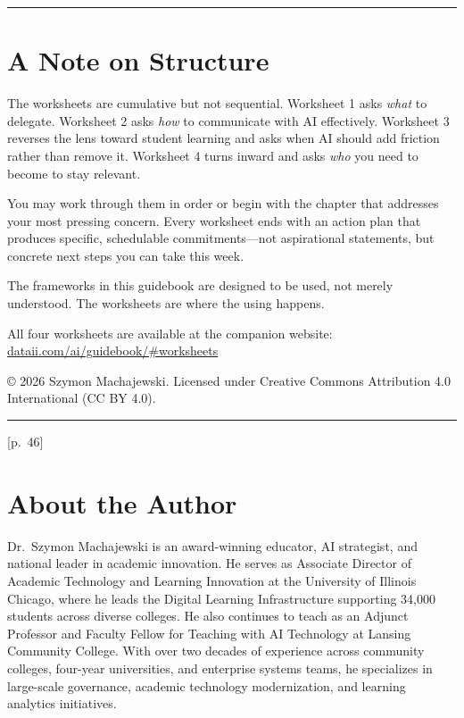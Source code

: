\documentclass[
  letterpaper,
  DIV=11,
  numbers=noendperiod]{scrreprt}
\begin{document}
\begin{center}\rule{0.5\linewidth}{0.5pt}\end{center}


\chapter{A Note on Structure}\label{a-note-on-structure}

The worksheets are cumulative but not sequential. Worksheet 1 asks
\emph{what} to delegate. Worksheet 2 asks \emph{how} to communicate with
AI effectively. Worksheet 3 reverses the lens toward student learning
and asks when AI should add friction rather than remove it. Worksheet 4
turns inward and asks \emph{who} you need to become to stay relevant.

You may work through them in order or begin with the chapter that
addresses your most pressing concern. Every worksheet ends with an
action plan that produces specific, schedulable commitments---not
aspirational statements, but concrete next steps you can take this week.

The frameworks in this guidebook are designed to be used, not merely
understood. The worksheets are where the using happens.

All four worksheets are available at the companion website:
\href{https://dataii.com/ai/guidebook/\#worksheets}{dataii.com/ai/guidebook/\#worksheets}

© 2026 Szymon Machajewski. Licensed under Creative Commons Attribution
4.0 International (CC BY 4.0).

\begin{center}\rule{0.5\linewidth}{0.5pt}\end{center}

{[}p.~46{]}


\chapter{About the Author}\label{about-the-author}

Dr.~Szymon Machajewski is an award-winning educator, AI strategist, and
national leader in academic innovation. He serves as Associate Director
of Academic Technology and Learning Innovation at the University of
Illinois Chicago, where he leads the Digital Learning Infrastructure
supporting 34,000 students across diverse colleges. He also continues to
teach as an Adjunct Professor and Faculty Fellow for Teaching with AI
Technology at Lansing Community College. With over two decades of
experience across community colleges, four-year universities, and
enterprise systems teams, he specializes in large-scale governance,
academic technology modernization, and learning analytics initiatives.
\end{document}
